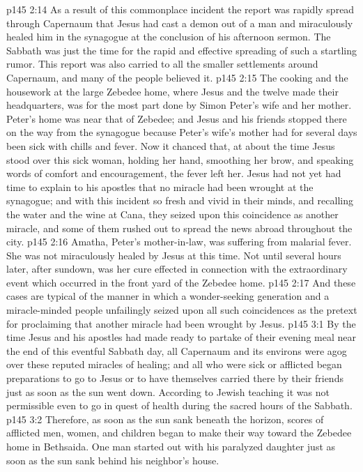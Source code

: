 \vs p145 2:14 As a result of this commonplace incident the report was rapidly spread through Capernaum that Jesus had cast a demon out of a man and miraculously healed him in the synagogue at the conclusion of his afternoon sermon. The Sabbath was just the time for the rapid and effective spreading of such a startling rumor. This report was also carried to all the smaller settlements around Capernaum, and many of the people believed it.
\pc \vs p145 2:15 The cooking and the housework at the large Zebedee home, where Jesus and the twelve made their headquarters, was for the most part done by Simon Peter’s wife and her mother. Peter’s home was near that of Zebedee; and Jesus and his friends stopped there on the way from the synagogue because Peter’s wife’s mother had for several days been sick with chills and fever. Now it chanced that, at about the time Jesus stood over this sick woman, holding her hand, smoothing her brow, and speaking words of comfort and encouragement, the fever left her. Jesus had not yet had time to explain to his apostles that no miracle had been wrought at the synagogue; and with this incident so fresh and vivid in their minds, and recalling the water and the wine at Cana, they seized upon this coincidence as another miracle, and some of them rushed out to spread the news abroad throughout the city.
\vs p145 2:16 Amatha, Peter’s mother\hyp{}in\hyp{}law, was suffering from malarial fever. She was not miraculously healed by Jesus at this time. Not until several hours later, after sundown, was her cure effected in connection with the extraordinary event which occurred in the front yard of the Zebedee home.
\pc \vs p145 2:17 And these cases are typical of the manner in which a wonder\hyp{}seeking generation and a miracle\hyp{}minded people unfailingly seized upon all such coincidences as the pretext for proclaiming that another miracle had been wrought by Jesus.
\vs p145 3:1 By the time Jesus and his apostles had made ready to partake of their evening meal near the end of this eventful Sabbath day, all Capernaum and its environs were agog over these reputed miracles of healing; and all who were sick or afflicted began preparations to go to Jesus or to have themselves carried there by their friends just as soon as the sun went down. According to Jewish teaching it was not permissible even to go in quest of health during the sacred hours of the Sabbath.
\vs p145 3:2 Therefore, as soon as the sun sank beneath the horizon, scores of afflicted men, women, and children began to make their way toward the Zebedee home in Bethsaida. One man started out with his paralyzed daughter just as soon as the sun sank behind his neighbor’s house.
